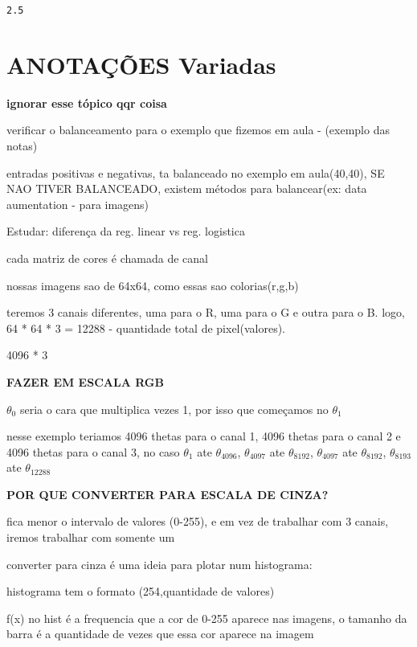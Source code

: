 \documentclass[11pt]{article}
\newcommand{\prompt}[4]{
        \llap{{\color{#2}[#3]: #4}}\vspace{-1.25em}
    }
\begin{document}
            \begin{tcolorbox}[breakable, boxrule=.5pt, size=fbox, pad at break*=1mm, opacityfill=0]
\prompt{Out}{outcolor}{6}{\hspace{3.5pt}}
\begin{Verbatim}[commandchars=\\\{\}]
2.5
\end{Verbatim}
\end{tcolorbox}
        
    \hypertarget{anotauxe7uxf5es-variadas}{%
\section{ANOTAÇÕES Variadas}\label{anotauxe7uxf5es-variadas}}

\textbf{ignorar esse tópico qqr coisa}

verificar o balanceamento para o exemplo que fizemos em aula - (exemplo
das notas)

entradas positivas e negativas, ta balanceado no exemplo em aula(40,40),
SE NAO TIVER BALANCEADO, existem métodos para balancear(ex: data
aumentation - para imagens)

Estudar: diferença da reg. linear vs reg. logistica

cada matriz de cores é chamada de canal

nossas imagens sao de 64x64, como essas sao colorias(r,g,b)

teremos 3 canais diferentes, uma para o R, uma para o G e outra para o
B. logo, 64 * 64 * 3 = 12288 - quantidade total de pixel(valores).

4096 * 3

\textbf{FAZER EM ESCALA RGB}

\(\theta_0\) seria o cara que multiplica vezes 1, por isso que começamos
no \(\theta_1\)

nesse exemplo teriamos 4096 thetas para o canal 1, 4096 thetas para o
canal 2 e 4096 thetas para o canal 3, no caso \(\theta_1\) ate
\(\theta_{4096}\), \(\theta_{4097}\) ate \(\theta_{8192}\),
\(\theta_{4097}\) ate \(\theta_{8192}\), \(\theta_{8193}\) ate
\(\theta_{12288}\)

\textbf{POR QUE CONVERTER PARA ESCALA DE CINZA?}

fica menor o intervalo de valores (0-255), e em vez de trabalhar com 3
canais, iremos trabalhar com somente um

converter para cinza é uma ideia para plotar num histograma:

histograma tem o formato (254,quantidade de valores)

f(x) no hist é a frequencia que a cor de 0-255 aparece nas imagens, o
tamanho da barra é a quantidade de vezes que essa cor aparece na imagem


    
    
    
    
\end{document}
